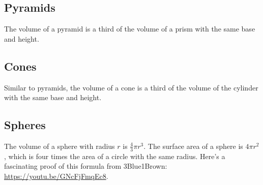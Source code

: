 \documentclass{article}
\begin{document}
\begin{multicols}{2}
	\subsection*{Pyramids}
	The volume of a pyramid is a third of the volume of a prism with the same base and height.

	\subsection*{Cones}
	Similar to pyramids, the volume of a cone is a third of the volume of the cylinder with the same base and height.

	\subsection*{Spheres}
	The volume of a sphere with radius $r$ is $\frac{4}{3}\pi r^3$.
	The surface area of a sphere is $4\pi r^2$, which is four times the area of a circle with the same radius.
	Here's a fascinating proof of this formula from 3Blue1Brown: \url{https://youtu.be/GNcFjFmqEc8}.
\end{multicols}
\end{document}
